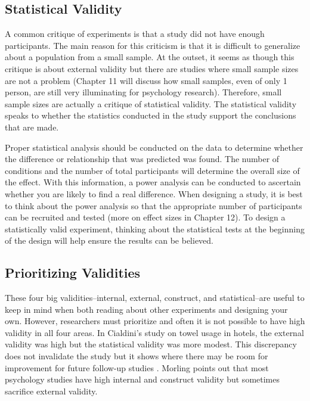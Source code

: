 \subsection{Statistical Validity}

A common critique of experiments is that a study did not have enough participants. The main reason for this criticism is that it is difficult to generalize about a population from a small sample. At the outset, it seems as though this critique is about external validity but there are studies where small sample sizes are not a problem (Chapter 11 will discuss how small samples, even of only 1 person, are still very illuminating for psychology research). Therefore, small sample sizes are actually a critique of statistical validity. The statistical validity speaks to whether the statistics conducted in the study support the conclusions that are made.

Proper statistical analysis should be conducted on the data to determine whether the difference or relationship that was predicted was found. The number of conditions and the number of total participants will determine the overall size of the effect. With this information, a power analysis can be conducted to ascertain whether you are likely to find a real difference. When designing a study, it is best to think about the power analysis so that the appropriate number of participants can be recruited and tested (more on effect sizes in Chapter 12). To design a statistically valid experiment, thinking about the statistical tests at the beginning of the design will help ensure the results can be believed.

\subsection{Prioritizing Validities}

These four big validities–internal, external, construct, and statistical–are useful to keep in mind when both reading about other experiments and designing your own. However, researchers must prioritize and often it is not possible to have high validity in all four areas. In Cialdini's study on towel usage in hotels, the external validity was high but the statistical validity was more modest. This discrepancy does not invalidate the study but it shows where there may be room for improvement for future follow-up studies \citep{goldstein_room_2008}. Morling \citeyear{morling_guide_2014} points out that most psychology studies have high internal and construct validity but sometimes sacrifice external validity.

